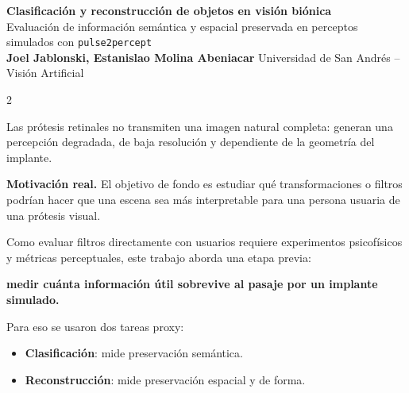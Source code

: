 \documentclass[final]{article}
\newcommand{\PosterTitle}[1]{%
    {\fontsize{50}{56}\selectfont\bfseries\color{white} #1}
}
\newcommand{\PosterSubtitle}[1]{%
    {\fontsize{19.5}{23}\selectfont\color{white} #1}
}
\newcommand{\sectionbox}[2]{%
\begin{tcolorbox}[
    enhanced,
    colback=white,
    colframe=mainblue,
    boxrule=1.22pt,
    arc=2.5mm,
    left=3mm,
    right=3mm,
    top=2.2mm,
    bottom=2.2mm,
    title=\fontsize{19.4}{22.8}\selectfont\bfseries #1,
    coltitle=white,
    colbacktitle=mainblue,
    fonttitle=\bfseries,
    attach boxed title to top left={xshift=3mm,yshift=-1.55mm},
    boxed title style={arc=1.8mm,boxrule=0pt},
    fontupper=\fontsize{15.1}{17.6}\selectfont
]
#2
\end{tcolorbox}
\vspace{0.04cm}
}
\begin{document}
\noindent
\begin{minipage}[t]{\textwidth}

\begin{tcolorbox}[
    enhanced,
    colback=mainblue,
    colframe=mainblue,
    arc=0mm,
    boxrule=0pt,
    left=8mm,
    right=8mm,
    top=4.4mm,
    bottom=4.4mm
]
\PosterTitle{Clasificación y reconstrucción de objetos en visión biónica}\\[0.18em]
\PosterSubtitle{Evaluación de información semántica y espacial preservada en perceptos simulados con \texttt{pulse2percept}}\\[0.20em]
{\fontsize{18}{21}\selectfont\color{white}
\textbf{Joel Jablonski, Estanislao Molina Abeniacar}
\hfill
Universidad de San Andrés -- Visión Artificial
}
\end{tcolorbox}

\vspace{0.20cm}

\begin{multicols}{2}
\setlength{\columnsep}{0.9cm}

\sectionbox{1. Problema y motivación}{
Las prótesis retinales no transmiten una imagen natural completa: generan una percepción degradada, de baja resolución y dependiente de la geometría del implante.

\textbf{Motivación real.}
El objetivo de fondo es estudiar qué transformaciones o filtros podrían hacer que una escena sea más interpretable para una persona usuaria de una prótesis visual.

Como evaluar filtros directamente con usuarios requiere experimentos psicofísicos y métricas perceptuales, este trabajo aborda una etapa previa:

\begin{center}
\textbf{medir cuánta información útil sobrevive al pasaje por un implante simulado.}
\end{center}

Para eso se usaron dos tareas proxy:
\begin{itemize}
    \item \textbf{Clasificación}: mide preservación semántica.
    \item \textbf{Reconstrucción}: mide preservación espacial y de forma.
\end{itemize}
}


\end{multicols}
\end{minipage}
\end{document}
